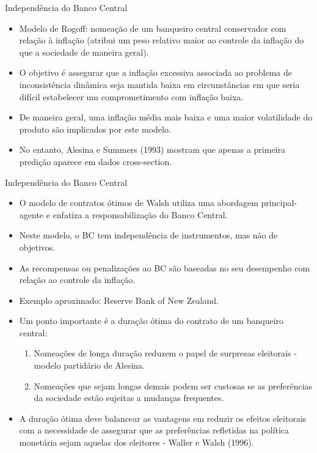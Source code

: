 \documentclass[10pt]{beamer}
\begin{document}
\begin{frame}{Independência do Banco Central}
    \begin{itemize}
        \item Modelo de Rogoff: nomeação de um banqueiro central conservador com relação à inflação (atribui um peso relativo maior ao controle da inflação do que a sociedade de maneira geral).
        \bigskip
        \item O objetivo é assegurar que a inflação excessiva associada ao problema de inconsistência dinâmica seja mantida baixa em circunstâncias em que seria difícil estabelecer um comprometimento com inflação baixa.
        \bigskip
        \item De maneira geral, uma inflação média mais baixa e uma maior volatilidade do produto são implicados por este modelo.
        \bigskip
        \item No entanto, Alesina e Summers (1993) mostram que apenas a primeira predição aparece em dados cross-section.
    \end{itemize}
\end{frame}

\begin{frame}{Independência do Banco Central}
    \begin{itemize}
        \item O modelo de contratos ótimos de Walsh utiliza uma abordagem principal-agente e enfatiza a responsabilização do Banco Central.
        \bigskip
        \item Neste modelo, o BC tem independência de instrumentos, mas não de objetivos.
        \bigskip
        \item As recompensas ou penalizações ao BC são baseadas no seu desempenho com relação ao controle da inflação.
        \bigskip
        \item Exemplo aproximado: Reserve Bank of New Zealand.
        \bigskip
        \item Um ponto importante é a duração ótima do contrato de um banqueiro central:
        \bigskip
        \begin{enumerate}
            \item Nomeações de longa duração reduzem o papel de surpresas eleitorais - modelo partidário de Alesina.
            \bigskip
            \item Nomeações que sejam longas demais podem ser custosas se as preferências da sociedade estão sujeitas a mudanças frequentes.
        \end{enumerate}
        \bigskip
        \item A duração ótima deve balancear as vantagens em reduzir os efeitos eleitorais com a necessidade de assegurar que as preferências refletidas na política monetária sejam aquelas dos eleitores - Waller e Walsh (1996).
    \end{itemize}
\end{frame}
\end{document}
